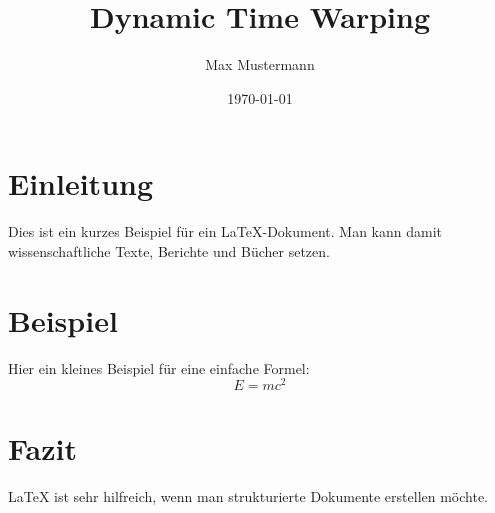 \documentclass[a4paper,12pt]{article}
\title{Dynamic Time Warping}
\author{Max Mustermann}
\date{\today}
\begin{document}
\maketitle

\section{Einleitung}
Dies ist ein kurzes Beispiel für ein LaTeX-Dokument.  
Man kann damit wissenschaftliche Texte, Berichte und Bücher setzen.

\section{Beispiel}
Hier ein kleines Beispiel für eine einfache Formel:
\[
E = mc^2
\]

\section{Fazit}
LaTeX ist sehr hilfreich, wenn man strukturierte Dokumente erstellen möchte.
\cite{einstein1920}


\end{document}
